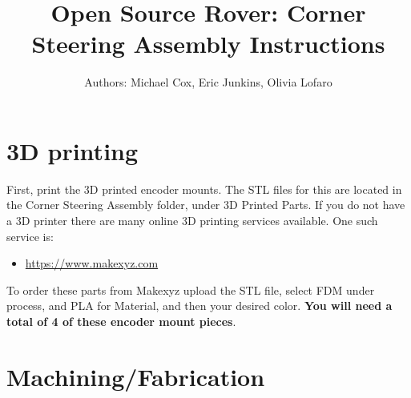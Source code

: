 \documentclass[12pt]{article}
\begin{document}
\title{Open Source Rover: Corner Steering Assembly Instructions}
\author{Authors: Michael Cox, Eric Junkins, Olivia Lofaro}

\makeatletter         
\def\@maketitle{
\begin{center}	
	\makebox[\textwidth][c]{ \texttt{[image: "Pictures/Corner Title".png]}}
	{\Huge \bfseries \sffamily \@title }\\[3ex] 
	{\Large \sffamily \@author}\\[3ex] 
	\texttt{[image: "Pictures/JPL logo".png]}
\end{center}}
\makeatother

\maketitle



\newpage

\tableofcontents


\section{3D printing}
First, print the 3D printed encoder mounts. The STL files for this are located in the Corner Steering Assembly folder, under 3D Printed Parts. If you do not have a 3D printer there are many online 3D printing services available. One such service is:

\begin{itemize}
	\item \href{https://www.makexyz.com}{https://www.makexyz.com}
\end{itemize}

To order these parts from Makexyz upload the STL file, select FDM under process, and PLA for Material, and then your desired color. \textbf{You will need a total of 4 of these encoder mount pieces}. 

\section{Machining/Fabrication}
\end{document}
